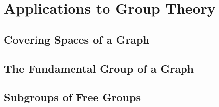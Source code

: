 \chapter{Applications to Group Theory}

\section{Covering Spaces of a Graph}

\section{The Fundamental Group of a Graph}

\section{Subgroups of Free Groups}
